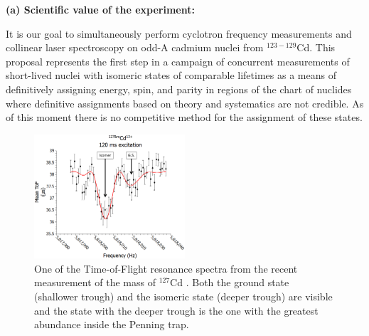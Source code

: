 \documentclass[12pt]{article}
\newcounter{expnum}
\begin{document}
\setcounter{expnum}{1754} %


\noindent\textbf{(a) Scientific value of the experiment:}

It is our goal to simultaneously perform cyclotron frequency measurements and collinear laser spectroscopy on odd-A cadmium nuclei from $^{123-129}$Cd. This proposal represents the first step in a campaign of concurrent measurements of short-lived nuclei with isomeric states of comparable lifetimes as a means of definitively assigning energy, spin, and parity in regions of the chart of nuclides where definitive assignments based on theory and systematics are not credible. As of this moment there is no competitive method for the assignment of these states.

\begin{figure}[ht]
    \begin{center}
        \includegraphics[width=0.5\textwidth]{127Cd.png}
        \caption[$^{127}$Cd ToF Spectrum]{One of the Time-of-Flight resonance spectra from the recent measurement of the mass of $^{127}$Cd \cite{Lascar2017}. Both the ground state (shallower trough) and the isomeric state (deeper trough) are visible and the state with the deeper trough is the one with the greatest abundance inside the Penning trap.}
        \label{fig:127Cd}
    \end{center}
\end{figure}
\end{document}
